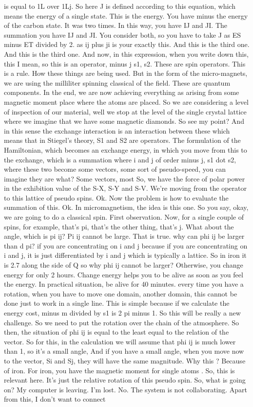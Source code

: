 is equal to 1L over 1Lj. So here J is defined according to this equation, which means the energy of a single state. This is the energy. You have minus the energy of the carbon state. It was two times. In this way, you have IJ and JI. The summation you have IJ and JI. You consider both, so you have to take J as ES minus ET divided by 2. as ij plus ji is your exactly this. And this is the third one. And this is the third one. And now, in this expression, when you write down this, this I mean, so this is an operator, minus j s1, s2. These are spin operators. This is a rule. How these things are being used. But in the form of the micro-magnets, we are using the milliliter spinning classical of the field. These are quantum components. In the end, we are now achieving everything as arising from some magnetic moment place where the atoms are placed. So we are considering a level of inspection of our material, well we stop at the level of the single crystal lattice where we imagine that we have some magnetic diamonds. So see my point? And in this sense the exchange interaction is an interaction between these which means that in Stiegel's theory, S1 and S2 are operators. The formulation of the Hamiltonian, which becomes an exchange energy, in which you move from this to the exchange, which is a summation where i and j of order minus j, s1 dot s2, where these two become some vectors, some sort of pseudo-speed, you can imagine they are what? Some vectors, most So, we have the force of polar power in the exhibition value of the S-X, S-Y and S-V. We're moving from the operator to this lattice of pseudo spins. Ok. Now the problem is how to evaluate the summation of this. Ok. In micromagnetism, the idea is this one. So you say, okay, we are going to do a classical spin. First observation. Now, for a single couple of spins, for example, that's pi, that's the other thing, that's j. What about the angle, which is pi ij? Pi ij cannot be large. That is true. why can phi ij be larger than d pi? if you are concentrating on i and j because if you are concentrating on i and j, it is just differentiated by i and j which is typically a lattice. So in iron it is 2.7 along the side of Q so why phi ij cannot be larger? Otherwise, you change energy for only 2 hours. Change energy helps you to be alive as soon as you feel the energy. In practical situation, be alive for 40 minutes. every time you have a rotation, when you have to move one domain, another domain, this cannot be done just to work in a single line. This is simple because if we calculate the energy cost, minus m divided by s1 is 2 pi minus 1. So this will be really a new challenge. So we need to put the rotation over the chain of the atmosphere. So then, the situation of phi ij is equal to the least equal to the relation of the vector. So for this, in the calculation we will assume that phi ij is much lower than 1, so it's a small angle, And if you have a small angle, when you move now to the vector, Si and Sj, they will have the same magnitude. Why this ? Because of iron. For iron, you have the magnetic moment for single atoms . So, this is relevant here. It's just the relative rotation of this pseudo spin. So, what is going on? My computer is leaving. I'm lost. No. The system is not collaborating. Apart from this, I don't want to connect 